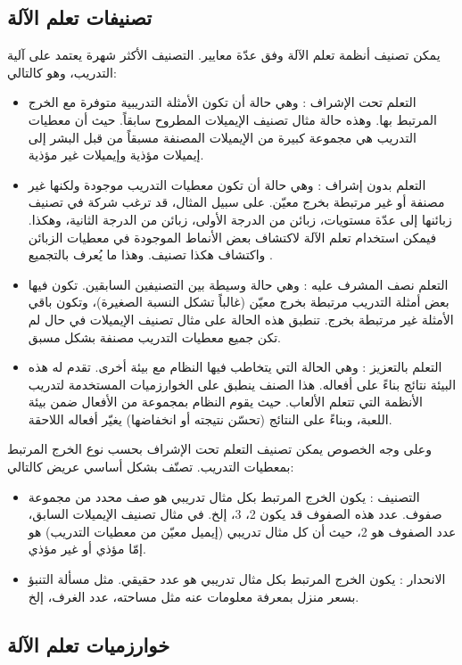 \subsection{تصنيفات تعلم الآلة}
يمكن تصنيف أنظمة تعلم الآلة وفق عدّة معايير. التصنيف الأكثر شهرة يعتمد على آلية التدريب، وهو كالتالي:
\begin{itemize}
	\item
	التعلم تحت الإشراف :
	وهي حالة أن تكون الأمثلة التدريبية متوفرة مع الخرج  المرتبط بها. وهذه حالة مثال تصنيف الإيميلات المطروح سابقاً.
	حيث أن معطيات التدريب هي مجموعة كبيرة من الإيميلات المصنفة مسبقاً من قبل البشر إلى إيميلات مؤذية وإيميلات غير مؤذية.
	\item
	التعلم بدون إشراف :
	وهي حالة أن تكون معطيات التدريب موجودة ولكنها غير مصنفة  أو غير مرتبطة بخرج معيّن.
	على سبيل المثال، قد ترغب شركة في تصنيف زبائنها إلى عدّة مستويات، زبائن من الدرجة الأولى، زبائن من الدرجة الثانية، وهكذا.
	فيمكن استخدام تعلم الآلة لاكتشاف بعض الأنماط الموجودة في معطيات الزبائن واكتشاف هكذا تصنيف.
	وهذا ما يُعرف بالتجميع .
	\item
	التعلم نصف المشرف عليه :
	وهي حالة وسيطة بين التصنيفين السابقين. تكون فيها بعض أمثلة التدريب مرتبطة بخرج معيّن (غالباً تشكل النسبة الصغيرة)،
	وتكون باقي الأمثلة غير مرتبطة بخرج. تنطبق هذه الحالة على مثال تصنيف الإيميلات في حال لم تكن جميع معطيات التدريب مصنفة بشكل مسبق.
	\item 
	التعلم بالتعزيز :
	وهي الحالة التي يتخاطب فيها النظام مع بيئة أخرى. تقدم له هذه البيئة نتائج  بناءً على أفعاله.
	هذا الصنف ينطبق على الخوارزميات المستخدمة لتدريب الأنظمة التي تتعلم الألعاب.
	حيث يقوم النظام بمجموعة من الأفعال  ضمن بيئة اللعبة،
	وبناءً على النتائج (تحسّن نتيجته أو انخفاضها) يغيّر أفعاله اللاحقة.
\end{itemize}

وعلى وجه الخصوص يمكن تصنيف التعلم تحت الإشراف بحسب نوع الخرج المرتبط بمعطيات التدريب.
تصنّف بشكل أساسي عريض كالتالي:
\begin{itemize}
	\item 
	التصنيف :
	يكون الخرج المرتبط بكل مثال تدريبي هو صف  محدد من مجموعة صفوف. عدد هذه الصفوف قد يكون 2، 3، إلخ.
	في مثال تصنيف الإيميلات السابق، عدد الصفوف هو 2، حيث أن كل مثال تدريبي (إيميل معيّن من معطيات التدريب) هو إمّا مؤذي أو غير مؤذي.
	\item 
	الانحدار :
	يكون الخرج المرتبط بكل مثال تدريبي هو عدد حقيقي. مثل مسألة التنبؤ بسعر منزل بمعرفة معلومات عنه مثل مساحته، عدد الغرف، إلخ.
\end{itemize}

\subsection{خوارزميات تعلم الآلة}



